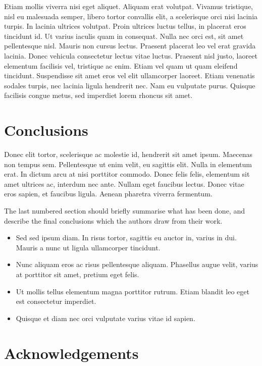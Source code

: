 \documentclass[a4paper,fleqn,usenatbib]{mnras}
\begin{document}
Etiam mollis viverra nisi eget aliquet. Aliquam erat volutpat. Vivamus tristique, nisl eu malesuada semper, libero tortor convallis elit, a scelerisque orci nisi lacinia turpis. In lacinia ultrices volutpat. Proin ultrices luctus tellus, in placerat eros tincidunt id. Ut varius iaculis quam in consequat. Nulla nec orci est, sit amet pellentesque nisl. Mauris non cursus lectus. Praesent placerat leo vel erat gravida lacinia. Donec vehicula consectetur lectus vitae luctus. Praesent nisl justo, laoreet elementum facilisis vel, tristique ac enim. Etiam vel quam ut quam eleifend tincidunt. Suspendisse sit amet eros vel elit ullamcorper laoreet. Etiam venenatis sodales turpis, nec lacinia ligula hendrerit nec. Nam eu vulputate purus. Quisque facilisis congue metus, sed imperdiet lorem rhoncus sit amet.


\section{Conclusions}\label{sec:conclusions} 
Donec elit tortor, scelerisque ac molestie id, hendrerit sit amet ipsum. Maecenas non tempus sem. Pellentesque ut enim velit, eu sagittis elit. Nulla in elementum erat. In dictum arcu at nisi porttitor commodo. Donec felis felis, elementum sit amet ultrices ac, interdum nec ante. Nullam eget faucibus lectus. Donec vitae eros sapien, et faucibus ligula. Aenean pharetra viverra fermentum.

The last numbered section should briefly summarise what has been done, and describe
the final conclusions which the authors draw from their work.

\begin{itemize}
  \item Sed sed ipsum diam. In risus tortor, sagittis eu auctor in, varius in dui. Mauris a nunc ut ligula ullamcorper tincidunt. 
  \item Nunc aliquam eros ac risus pellentesque aliquam. Phasellus augue velit, varius at porttitor sit amet, pretium eget felis. 
  \item Ut mollis tellus elementum magna porttitor rutrum. Etiam blandit leo eget est consectetur imperdiet. 
 \item Quisque et diam nec orci vulputate varius vitae id sapien.
\end{itemize}



\section*{Acknowledgements}
\end{document}
